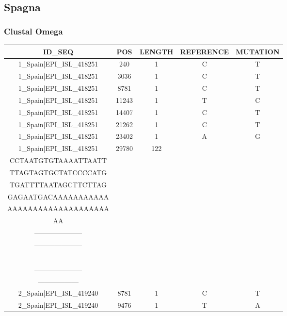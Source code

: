 \documentclass[a4paper,10pt]{article}
\begin{document}
\newpage

\subsection{Spagna}
\subsubsection{Clustal Omega}


\setlength\LTleft{-2.5 cm}
\begin{longtable}{@{}ccccc@{}}
\toprule
\textbf{ID\_SEQ} & \textbf{POS} & \textbf{LENGTH} & \textbf{REFERENCE} & \textbf{MUTATION} \\* \midrule
\endfirsthead
%
\cline{1-5}
\endhead
%
1\_Spain|EPI\_ISL\_418251 & 240 & 1 & C & T \\* \midrule
1\_Spain|EPI\_ISL\_418251 & 3036 & 1 & C & T \\* \midrule
1\_Spain|EPI\_ISL\_418251 & 8781 & 1 & C & T \\* \midrule
1\_Spain|EPI\_ISL\_418251 & 11243 & 1 & T & C \\* \midrule
1\_Spain|EPI\_ISL\_418251 & 14407 & 1 & C & T \\* \midrule
1\_Spain|EPI\_ISL\_418251 & 21262 & 1 & C & T \\* \midrule
1\_Spain|EPI\_ISL\_418251 & 23402 & 1 & A & G \\* \midrule
1\_Spain|EPI\_ISL\_418251 & 29780 & 122 & \begin{tabular}[c]{@{}c@{}}AGCTGCCTATATGGAAGAGC\\ CCTAATGTGTAAAATTAATT\\ TTAGTAGTGCTATCCCCATG\\ TGATTTTAATAGCTTCTTAG\\ GAGAATGACAAAAAAAAAAA\\ AAAAAAAAAAAAAAAAAAAA\\ AA\end{tabular} & \begin{tabular}[c]{@{}c@{}}--------------------\\ ---------------------\\ ---------------------\\ ---------------------\\ ---------------------\\ ------------------\end{tabular} \\* \midrule
2\_Spain|EPI\_ISL\_419240 & 8781 & 1 & C & T \\* \midrule
2\_Spain|EPI\_ISL\_419240 & 9476 & 1 & T & A \\* \midrule

\end{longtable}
\end{document}
